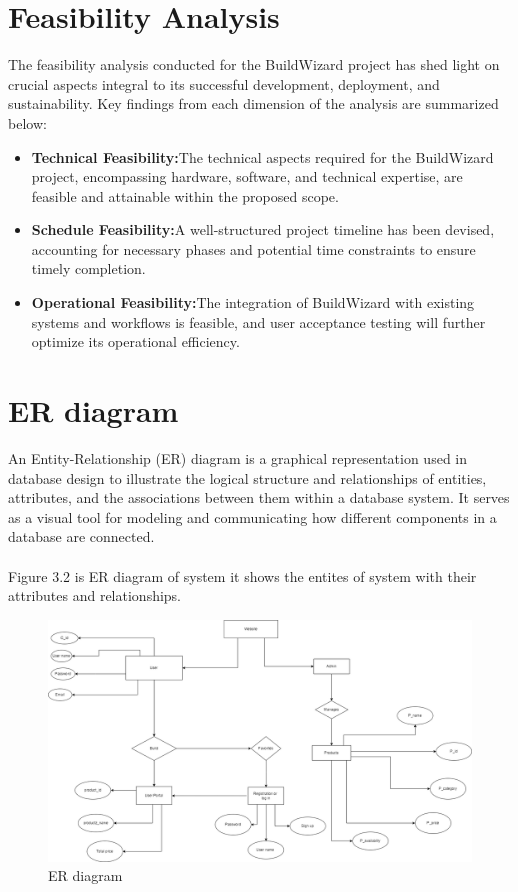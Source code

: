    \section{Feasibility Analysis}
   The feasibility analysis conducted for the BuildWizard project has shed light on crucial aspects integral to its successful development, deployment, and sustainability. Key findings from each dimension of the analysis are summarized below:
   \begin{itemize}
      \item \textbf{Technical Feasibility:}The technical aspects required for the BuildWizard project, encompassing hardware, software, and technical expertise, are feasible and attainable within the proposed scope.
      \item \textbf{Schedule Feasibility:}A well-structured project timeline has been devised, accounting for necessary phases and potential time constraints to ensure timely completion.
      \item \textbf{Operational Feasibility:}The integration of BuildWizard with existing systems and workflows is feasible, and user acceptance testing will further optimize its operational efficiency.
   \end{itemize}
   \newpage
      \section{ER diagram}
      An Entity-Relationship (ER) diagram is a graphical representation used in database design to illustrate the logical structure and relationships of entities, attributes, and the associations between them within a database system. It serves as a visual tool for modeling and communicating how different components in a database are connected.\\\\
      Figure 3.2 is ER diagram of system it shows the entites of system with their attributes and relationships.
      \begin{figure}[ht]
      \centering
      \includegraphics[width=15cm]{Diagrams/Pc_part_er_diagram.drawio.png}
      \caption{ER diagram}
      \end{figure}
